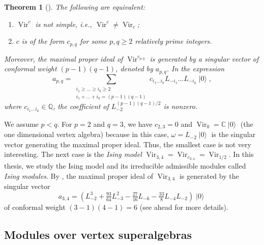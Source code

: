 \documentclass[a4paper, 12pt, reqno]{amsart}
\newtheorem{theorem}{Theorem}[section]
\theoremstyle{remark}
\DeclareMathOperator{\Vir}{Vir}
\DeclareMathOperator{\vac}{|0\rangle}
\begin{document}
\begin{theorem}[{\cite{gorelik_simplicity_2007}}]
  \label{thr:23}
  The following are equivalent:
  \begin{enumerate}
  \item $\Vir^c$ is not simple, i.e., $\Vir^c \neq \Vir_c$;
  \item $c$ is of the form $c_{p, q}$ for some $p, q \ge 2$ relatively prime integers.
  \end{enumerate}
  Moreover, the maximal proper ideal of $\Vir^{c_{p, q}}$ is generated by a singular vector of conformal weight $(p - 1)(q - 1)$, denoted by $a_{p, q}$.
  In the expression
  \begin{equation*}
    a_{p, q} = \sum_{\substack{i_1 \ge \dots \ge i_k \ge 2 \\ i_1 + \dots + i_k = (p - 1)(q - 1)}}c_{i_1\dots i_k}L_{-i_1}\dots L_{-i_k}\vac,
  \end{equation*}
  where $c_{i_1\dots i_k} \in \mathbb{Q}$, the coefficient of $L_{-2}^{(p - 1)(q - 1)/2}$ is nonzero.
\end{theorem}

We assume $p < q$.
For $p = 2$ and $q = 3$, we have $c_{2, 3} = 0$ and $\Vir_0 = \mathbb{C}\vac$ (the one dimensional vertex algebra) because in this case, $\omega = L_{-2}\vac$ is the singular vector generating the maximal proper ideal.
Thus, the smallest case is not very interesting.
The next case is the \emph{Ising model} $\Vir_{3, 4} = \Vir_{c_{3, 4}} = \Vir_{1/2}$.
In this thesis, we study the Ising model and its irreducible admissible modules called \emph{Ising modules}.
By , the maximal proper ideal of $\Vir_{3, 4}$ is generated by the singular vector
\begin{equation}
  \label{eq:22}
  a_{3, 4} = (L_{-2}^3 + \tfrac{93}{64}L_{-3}^2 - \tfrac{27}{16}L_{-6} - \tfrac{33}{8}L_{-4}L_{-2})\vac
\end{equation}
of conformal weight $(3 - 1)(4 - 1) = 6$ (see  ahead for more details).

\subsection{Modules over vertex superalgebras}
\label{sec:modules-over-vertex}
\end{document}
